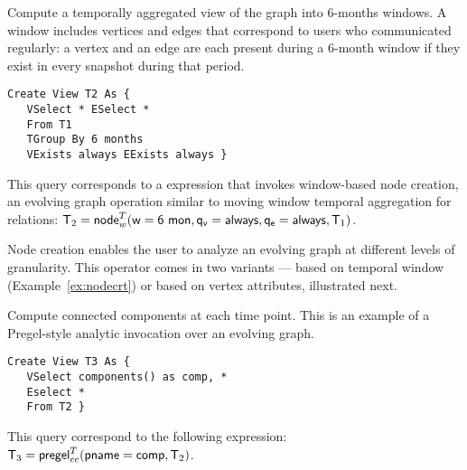 \begin{example}
\label{ex:nodecrt}

Compute a temporally aggregated view of the graph into 6-months
windows.  A window includes vertices and edges that correspond to
users who communicated regularly: a vertex and an edge are each
present during a 6-month window if they exist in every snapshot during
that period.

\begin{small} 
\begin{verbatim}
Create View T2 As { 
   VSelect * ESelect *
   From T1
   TGroup By 6 months
   VExists always EExists always }
\end{verbatim}
\end{small}

This query corresponds to a \tra expression that invokes window-based
node creation, an evolving graph operation similar to moving window
temporal aggregation for relations:
$\mathsf{T}_2 = \textsf{node}^T_w(\mathsf{w=6~mon},\mathsf{q_v=always},\mathsf{q_e=always},\mathsf{T}_1)$.

\end{example}

Node creation enables the user to analyze an evolving graph at
different levels of granularity.  This operator comes in two variants
--- based on temporal window (Example~\ref{ex:nodecrt}) or based
on vertex attributes, illustrated next.

\begin{example}
\label{ex:cc}

Compute connected components at each time point.  This is an
  example of a Pregel-style analytic invocation over an evolving
  graph.

\begin{small} 
\begin{verbatim}
Create View T3 As { 
   VSelect components() as comp, *
   Eselect *
   From T2 }
\end{verbatim}
\end{small}

This query correspond to the following \tra expression:
$\mathsf{T}_3 = \textsf{pregel}^T_{cc} (\mathsf{pname=comp}, \mathsf{T}_2)$.

\end{example}


